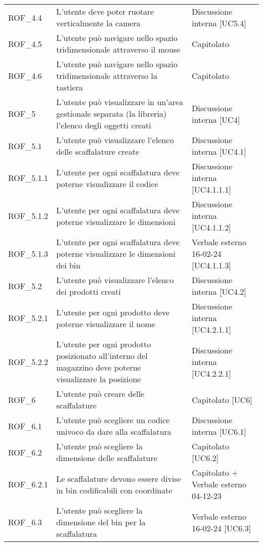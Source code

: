 \begin{xltabular}{\textwidth}{ p{0.2\textwidth} | X | p{0.2\textwidth} }
    ROF\_4.4& L'utente deve poter ruotare verticalmente la camera & Discussione interna [UC5.4] \\
    ROF\_4.5& L'utente può navigare nello spazio tridimensionale attraverso il mouse& Capitolato\\
    ROF\_4.6& L'utente può navigare nello spazio tridimensionale attraverso la tastiera& Capitolato\\
    ROF\_5& L'utente può visualizzare in un'area gestionale separata (la libreria) l'elenco degli oggetti creati & Discussione interna [UC4] \\
    ROF\_5.1& L'utente può visualizzare l'elenco delle scaffalature create & Discussione interna [UC4.1] \\
    ROF\_5.1.1& L'utente per ogni scaffalatura deve poterne visualizzare il codice & Discussione interna [UC4.1.1.1]\\
    ROF\_5.1.2& L'utente per ogni scaffalatura deve poterne visualizzare le dimensioni & Discussione interna [UC4.1.1.2]\\
    ROF\_5.1.3 & L'utente per ogni scaffalatura deve poterne visualizzare le dimensioni dei bin & Verbale esterno 16-02-24 [UC4.1.1.3]\\
    ROF\_5.2& L'utente può visualizzare l'elenco dei prodotti creati & Discussione interna [UC4.2] \\
    ROF\_5.2.1& L'utente per ogni prodotto deve poterne visualizzare il nome & Discussione interna [UC4.2.1.1]\\
    ROF\_5.2.2& L'utente per ogni prodotto posizionato all'interno del magazzino deve poterne visualizzare la posizione & Discussione interna [UC4.2.2.1] \\
    ROF\_6& L'utente può creare delle scaffalature & Capitolato [UC6]\\
    ROF\_6.1& L'utente può scegliere un codice univoco da dare alla scaffalatura & Discussione interna [UC6.1]\\
    ROF\_6.2& L'utente può scegliere la dimensione delle scaffalature & Capitolato [UC6.2]\\
    ROF\_6.2.1& Le scaffalature devono essere divise in bin codificabili con coordinate & Capitolato + Verbale esterno 04-12-23\\
    ROF\_6.3& L'utente può scegliere la dimensione del bin per la scaffalatura & Verbale esterno 16-02-24 [UC6.3]\\

\end{xltabular}
